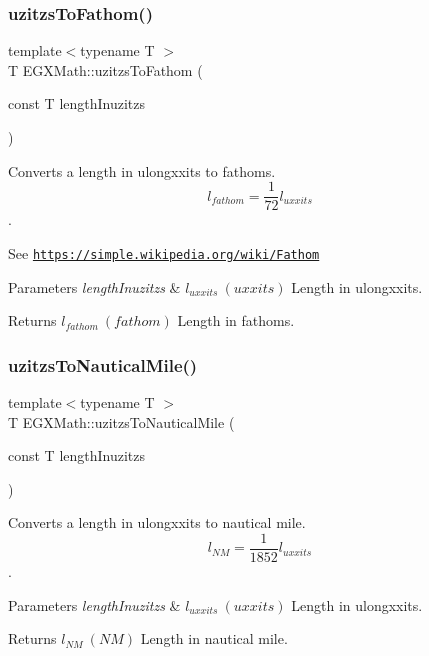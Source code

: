 \subsubsection{\texorpdfstring{uzitzs\+To\+Fathom()}{uzitzsToFathom()}}
{\footnotesize\ttfamily template$<$typename T $>$ \\
T E\+G\+X\+Math\+::uzitzs\+To\+Fathom (\begin{DoxyParamCaption}\item[{const T}]{length\+Inuzitzs }\end{DoxyParamCaption})}



Converts a length in ulongxxits to fathoms. \[ l_{fathom}= \frac{1}{72} l_{uxxits} \]. 

See \href{https://simple.wikipedia.org/wiki/Fathom}{\tt https\+://simple.\+wikipedia.\+org/wiki/\+Fathom} 
\begin{DoxyParams}{Parameters}
{\em length\+Inuzitzs} & $ l_{uxxits}\ (uxxits)$ Length in ulongxxits. \\
\hline
\end{DoxyParams}
\begin{DoxyReturn}{Returns}
$ l_{fathom}\ (fathom)$ Length in fathoms. 
\end{DoxyReturn}
\mbox{\label{group___e_g_x_math-_conversions-_length_conversions-uzitzs-_nautical_ga71c06fc85e22f77eba0b234edefa4562}} 
\subsubsection{\texorpdfstring{uzitzs\+To\+Nautical\+Mile()}{uzitzsToNauticalMile()}}
{\footnotesize\ttfamily template$<$typename T $>$ \\
T E\+G\+X\+Math\+::uzitzs\+To\+Nautical\+Mile (\begin{DoxyParamCaption}\item[{const T}]{length\+Inuzitzs }\end{DoxyParamCaption})}



Converts a length in ulongxxits to nautical mile. \[ l_{NM}= \frac{1}{1852} l_{uxxits} \]. 


\begin{DoxyParams}{Parameters}
{\em length\+Inuzitzs} & $ l_{uxxits}\ (uxxits)$ Length in ulongxxits. \\
\hline
\end{DoxyParams}
\begin{DoxyReturn}{Returns}
$ l_{NM}\ (NM)$ Length in nautical mile. 
\end{DoxyReturn}
